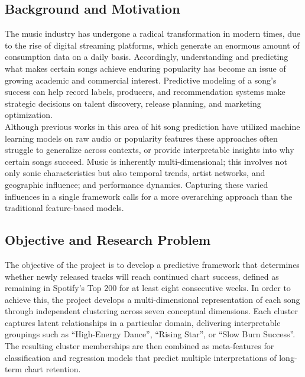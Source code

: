 \documentclass{article}
\begin{document}
\subsection{Background and Motivation}
The music industry has undergone a radical transformation in modern times, due to the rise of digital streaming platforms, which generate an enormous amount of consumption data on a daily basis. Accordingly, understanding and predicting what makes certain songs achieve enduring popularity has become an issue of growing academic and commercial interest. Predictive modeling of a song's success can help record labels, producers, and recommendation systems make strategic decisions on talent discovery, release planning, and marketing optimization.\\
Although previous works in this area of hit song prediction have utilized machine learning models on raw audio or popularity features \cite{gulmatico2022spotipred, martin2020multimodal} these approaches often struggle to generalize across contexts, or provide
interpretable insights into why certain songs succeed. Music is inherently multi-dimensional;
this involves not only sonic characteristics but also temporal trends, artist networks, and geographic influence;
and performance dynamics. Capturing these varied influences in a single framework calls for a
more overarching approach than the traditional feature-based models.
\subsection{Objective and Research Problem}
The objective of the project is to develop a predictive framework that determines whether newly
released tracks will reach continued chart success, defined as remaining in Spotify's Top 200
for at least eight consecutive weeks. In order to achieve this, the project develops a multi-dimensional representation of each song through independent clustering across seven conceptual dimensions. 
Each cluster captures latent relationships in a particular domain, delivering interpretable groupings such as “High-Energy Dance”, “Rising Star”, or “Slow Burn Success”. The resulting cluster memberships
are then combined as meta-features for classification and regression models that predict multiple interpretations of long-term chart retention.

\end{document}
